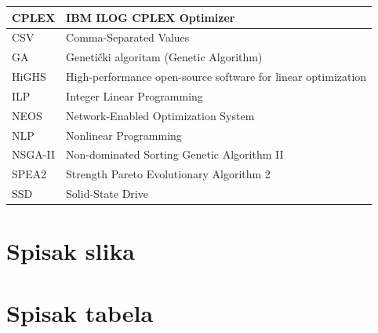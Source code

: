 \documentclass[12pt]{article}
\begin{document}
\begin{table}[H]
\centering
\begin{tabular}{|l|l|}
\hline
CPLEX & IBM ILOG CPLEX Optimizer \\ \hline
CSV & Comma-Separated Values \\ \hline
GA & Genetički algoritam (Genetic Algorithm) \\ \hline
HiGHS & High-performance open-source software for linear optimization \\ \hline
ILP & Integer Linear Programming \\ \hline
NEOS & Network-Enabled Optimization System \\ \hline
NLP & Nonlinear Programming \\ \hline
NSGA-II & Non-dominated Sorting Genetic Algorithm II \\ \hline
SPEA2 & Strength Pareto Evolutionary Algorithm 2 \\ \hline
SSD & Solid-State Drive \\ \hline
\end{tabular}
\end{table}

\pagebreak

\section*{Spisak slika}
\renewcommand{\listfigurename}{}
\listoffigures

\pagebreak

\section*{Spisak tabela}
\renewcommand{\listtablename}{}
\listoftables
\end{document}
